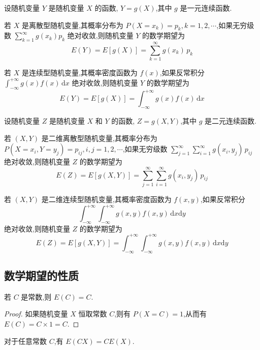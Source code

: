 \begin{theorem}
    \indent 设随机变量 $Y$ 是随机变量 $X$ 的函数, $Y=g(X)$,其中 $g$ 是一元连续函数.

    若 $X$ 是离散型随机变量,其概率分布为 $P(X=x_k) = p_k, k=1,2,\cdots$,如果无穷级数 $\displaystyle\sum_{k=1}^{\infty} g(x_k) p_k$ 绝对收敛,则随机变量 $Y$ 的数学期望为
    $$
    E(Y) = E[g(X)] = \sum_{k=1}^{\infty} g(x_k) \, p_k
    $$

    若 $X$ 是连续型随机变量,其概率密度函数为 $f(x)$,如果反常积分 $\displaystyle\int_{-\infty}^{+\infty} g(x) f(x) \, \text{d}x$ 绝对收敛,则随机变量 $Y$ 的数学期望为
    $$
    E(Y) = E[g(X)] = \int_{-\infty}^{+\infty} g(x) f(x) \, \text{d}x
    $$
\end{theorem}

\begin{theorem}
    \indent 设随机变量 $Z$ 是随机变量 $X$ 和 $Y$ 的函数, $Z=g(X,Y)$,其中 $g$ 是二元连续函数.

    若 $(X,Y)$ 是二维离散型随机变量,其概率分布为 $P(X=x_i,Y=y_j) = p_{ij}, i,j=1,2,\cdots$,如果无穷级数 $\displaystyle\sum_{j=1}^{\infty} \displaystyle\sum_{i=1}^{\infty} g(x_i,y_j) \, p_{ij}$ 绝对收敛,则随机变量 $Z$ 的数学期望为
    $$
    E(Z) = E[g(X,Y)] = \sum_{j=1}^{\infty} \sum_{i=1}^{\infty} g(x_i,y_j) \, p_{ij}
    $$

    若 $(X,Y)$ 是二维连续型随机变量,其概率密度函数为 $f(x,y)$,如果反常积分
    $$
    \displaystyle\int_{-\infty}^{+\infty} \displaystyle\int_{-\infty}^{+\infty} g(x,y) f(x,y) \, \text{d}x \text{d}y
    $$
    绝对收敛,则随机变量 $Z$ 的数学期望为
    $$
    E(Z) = E[g(X,Y)] = \int_{-\infty}^{+\infty} \int_{-\infty}^{+\infty} g(x,y) f(x,y) \, \text{d}x \text{d}y
    $$
\end{theorem}

\subsection{数学期望的性质}

\begin{property}[][][property:E(C)=C]
    \indent 若 $C$ 是常数,则 $E(C)=C$.
\end{property}

\begin{proof}
    如果随机变量 $X$ 恒取常数 $C$,则有 $P(X=C)=1$,从而有 $E(C) = C \times 1 = C$.
\end{proof}

\begin{property}[][][property:E(CX)=CE(X)]
    \indent 对于任意常数 $C$,有 $E(CX)=CE(X)$.
\end{property}

